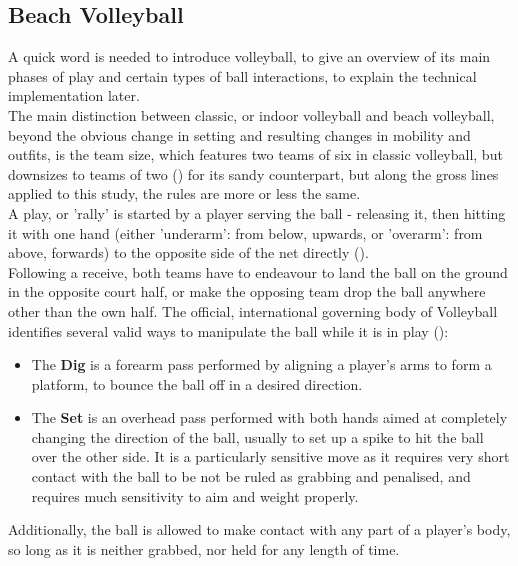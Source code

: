 \subsection{Beach Volleyball}

A quick word is needed to introduce volleyball, to give an overview of its main phases of play and certain types of ball interactions, to explain the technical implementation later.\\

The main distinction between classic, or indoor volleyball and beach volleyball, beyond the obvious change in setting and resulting changes in mobility and outfits, is the team size, which features two teams of six in classic volleyball, but downsizes to teams of two (\cite{fivb-2026-volleyball}) for its sandy counterpart,  but along the gross lines applied to this study, the rules are more or less the same.\\

A play, or 'rally' is started by a player serving the ball - releasing it, then hitting it with one hand (either 'underarm': from below, upwards, or 'overarm': from above, forwards) to the opposite side of the net directly (\cite{fivb-2026-volleyball}).\\

Following a receive, both teams have to endeavour to land the ball on the ground in the opposite court half, or make the opposing team drop the ball anywhere other than the own half. The official, international governing body of Volleyball identifies several valid ways to manipulate the ball while it is in play (\cite{fivb-2026-volleyball}):

\begin{itemize}
	\item The \textbf{Dig} is a forearm pass performed by aligning a player's arms to form a platform, to bounce the ball off in a desired direction.
	\item The \textbf{Set} is an overhead pass performed with both hands aimed at completely changing the direction of the ball, usually to set up a spike to hit the ball over the other side. It is a particularly sensitive move as it requires very short contact with the ball to be not be ruled as grabbing and penalised, and requires much sensitivity to aim and weight properly.
\end{itemize}

Additionally, the ball is allowed to make contact with any part of a player's body, so long as it is neither grabbed, nor held for any length of time.\\

